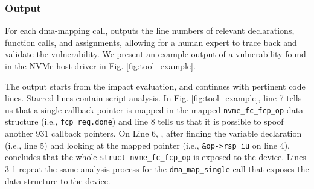 \begin{table}[]
\centering
{}
\vspace{1mm}
\caption{\tool result summary.}
\label{tab:static_analysis}
\end{table}

\subsubsection{Output}
For each dma-mapping call, \tool outputs the line numbers of relevant declarations, function calls, and assignments, allowing for a human expert to trace back and validate the vulnerability. We present an example output of a vulnerability found in the NVMe host driver in Fig. \ref{fig:tool_example}.

The output starts from the impact evaluation, and continues with pertinent code lines. Starred lines contain script analysis. In Fig. \ref{fig:tool_example}, line 7 tells us that a single callback pointer is mapped in the mapped \texttt{nvme\_fc\_fcp\_op} data structure (i.e., \texttt{fcp\_req.done}) and line 8 tells us that it is possible to spoof another 931 callback pointers.
On Line 6, \tool, after finding the variable declaration (i.e., line 5) and looking at the mapped pointer (i.e., \texttt{\&op->rsp\_iu} on line 4), concludes that the whole \texttt{struct nvme\_fc\_fcp\_op} is exposed to the device. Lines 3-1 repeat the same analysis process for the \texttt{dma\_map\_single} call that exposes the data structure to the device. 
